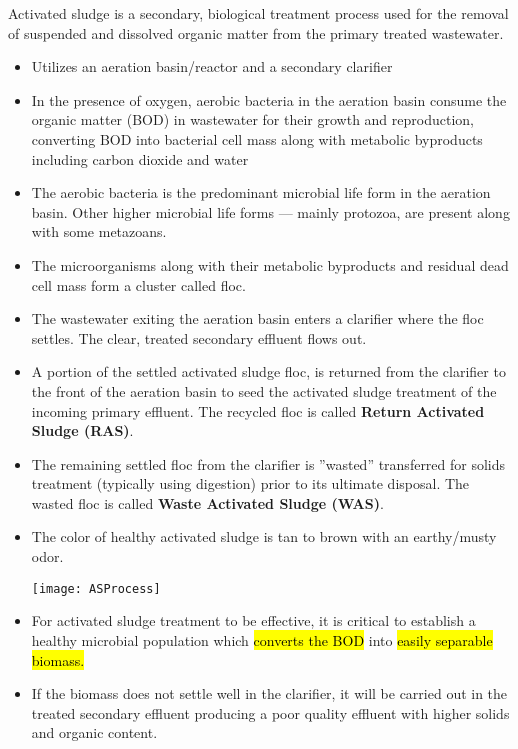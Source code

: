 Activated sludge is a secondary, biological treatment process used for the removal of suspended and dissolved organic matter from the primary treated wastewater.
\begin{itemize}
\item Utilizes an aeration basin/reactor and a secondary clarifier

\item In the presence of oxygen, aerobic bacteria in the aeration basin consume the organic matter (BOD) in wastewater for their growth and reproduction, converting BOD into bacterial cell mass along with metabolic byproducts including carbon dioxide and water

\item The aerobic bacteria is the predominant microbial life form in the aeration basin.  Other higher microbial life forms — mainly protozoa, are present along with some metazoans.

\item The microorganisms along with their metabolic byproducts and residual dead cell mass form a cluster called floc.

\item The wastewater exiting the aeration basin enters a clarifier where the floc settles.  The clear, treated secondary effluent flows out.

\item A portion of the settled activated sludge floc, is returned from the clarifier to the front of the aeration basin to seed the activated sludge treatment of the incoming primary effluent. The recycled floc is called \textbf{Return Activated Sludge (RAS)}.

\item The remaining settled floc from the clarifier is ”wasted” \textemdash transferred for solids treatment (typically using digestion) prior to its ultimate disposal. The wasted floc is called \textbf{Waste Activated Sludge (WAS)}.

\item The color of healthy activated sludge is tan to brown with an earthy/musty odor.

\begin{center}
\texttt{[image: ASProcess]}
\end{center}

\item For activated sludge treatment to be effective, it is critical to establish a healthy microbial population which \hl{converts the BOD} into \hl{easily separable biomass.}
\item If the biomass does not settle well in the clarifier, it will be carried out in the treated secondary effluent producing a poor quality effluent with higher solids and organic content.  \\
\end{itemize}

